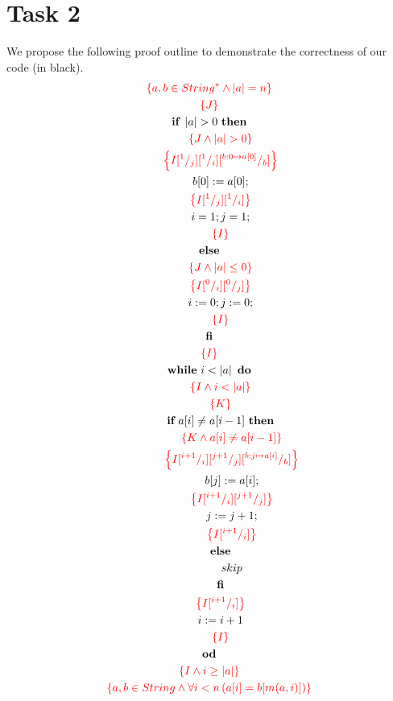 \documentclass[a4paper,12pt,fleqn]{scrartcl}
\newcommand{\assn}[1]{{\color{red}\left\{#1\right\}}}
\newcommand{\length}[1]{\left|#1\right|}
\begin{document}
\section{Task 2}
We propose the following proof outline to demonstrate the correctness
of our code (in black).
\begin{gather}
    \assn{a,b\in String^*\And\length{a} = n}\\
    \assn{J}\\
    \IF~ \length{a} >0 ~ \THEN\\
    \qquad \assn{J \And \length{a} > 0}\\
    \qquad \assn{I \subst{1}{j} \subst{1}{i} \subst{b:0 \mapsto a[0]}{b}}\\
    \qquad b[0] \Ass a[0];\\
    \qquad \assn{I \subst{1}{j} \subst{1}{i}  }\\
    \qquad i=1;j=1;\\
    \qquad \assn{I}\\
    \ELSE\\ 
    \qquad \assn{J \And \length{a} \leq 0}\\
    \qquad \assn{I\subst{0}{i}\subst{0}{j}}\\
    \qquad i\Ass 0;j\Ass 0;\\
    \qquad \assn{I}\\
    \FI\\
% 
    \assn{I}\\
    \WHILE~i<\length{a}~\DO\\
    \qquad \assn{I \And i < \length{a}}\\
    \qquad \assn{K }\\
    \qquad \IF~a[i] \neq a[i-1]~ \THEN\\
    \qquad \qquad \assn{K \And a[i]\neq a[i-1]}\\
    \qquad \qquad \assn{I \subst{i+1}{i} \subst{j+1}{j} \subst{b:j\mapsto a[i]}{b}}\\
    \qquad \qquad b[j] \Ass a[i];\\
    \qquad \qquad \assn{I \subst{i+1}{i} \subst{j+1}{j} }\\
    \qquad \qquad j \Ass j +1;\\
    \qquad \qquad \assn{I \subst{i+1}{i}}\\
    \qquad \ELSE\\
    \qquad \qquad skip \\
    \qquad \FI\\
    \qquad \assn{I \subst{i+1}{i}}\\
    \qquad i \Ass i +1 \\
    \qquad \assn{I}\\
    \OD\\
% 
    \assn{I \And i \geq \length{a}}\\
    \assn{a,b\in String \And \All {i < n}{a[i] = b[m(a,i)]}}
\end{gather}
\end{document}
